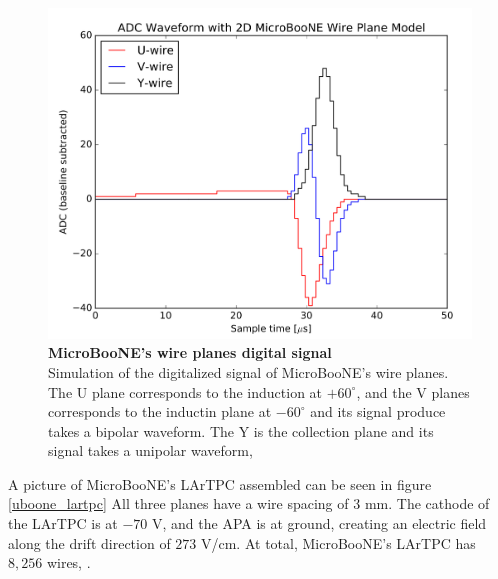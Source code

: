 \begin{figure}[h!]
	\begin{center}
		\includegraphics[scale=0.25]{Figures/uboone_dig_signal.png}
		\caption[MicroBooNE's wire planes digital signal]{{\textbf{MicroBooNE's wire planes digital signal}}  \\ Simulation of the digitalized signal of MicroBooNE's wire planes. The U plane corresponds to the induction at $+60^{\circ}$, and the V planes corresponds to the inductin plane at $-60^{\circ}$ and its signal produce takes a bipolar waveform. The Y is the collection plane and its signal takes a unipolar waveform, \cite{microboone_electronics}}
		\label{uboone_digital_signal}	
	\end{center}
\end{figure}

A picture of MicroBooNE's LArTPC assembled can be seen in figure \ref{uboone_lartpc} All three planes have a wire spacing of $3$ mm. The cathode of the LArTPC is at $-70$ V, and the APA is at ground, creating an electric field along the drift direction of $273$ V/cm. At total, MicroBooNE's LArTPC has $8,256$ wires, \cite{microboone_design}. 

